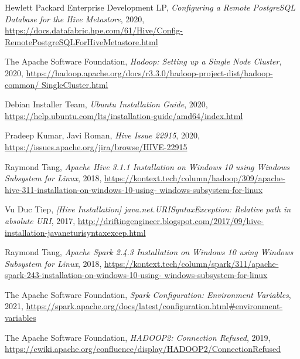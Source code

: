 \documentclass{article}
\begin{document}
\newpage
\begin{thebibliography}{9}
  Hewlett Packard Enterprise Development LP,
  \textit{Configuring a Remote PostgreSQL Database for the Hive Metastore},
  2020,
  \url{https://docs.datafabric.hpe.com/61/Hive/Config-RemotePostgreSQLForHiveMetastore.html}
  
  The Apache Software Foundation,
  \textit{Hadoop: Setting up a Single Node Cluster},
  2020,
  \url{
    https://hadoop.apache.org/docs/r3.3.0/hadoop-project-dist/hadoop-common/
    SingleCluster.html}

  Debian Installer Team,
  \textit{Ubuntu Installation Guide},
  2020,
  \url{https://help.ubuntu.com/lts/installation-guide/amd64/index.html}

  Pradeep Kumar, Javi Roman,
  \textit{Hive Issue 22915},
  2020,
  \url{https://issues.apache.org/jira/browse/HIVE-22915}

  Raymond Tang,
  \textit{Apache Hive 3.1.1 Installation on Windows 10 using Windows Subsystem for Linux},
  2018,
  \url{
    https://kontext.tech/column/hadoop/309/apache-hive-311-installation-on-windows-10-using-
    windows-subsystem-for-linux}

  Vu Duc Tiep,
  \textit{[Hive Installation] java.net.URISyntaxException: Relative path in absolute URI},
  2017,
  \url{http://driftingengineer.blogspot.com/2017/09/hive-installation-javaneturisyntaxexcep.html}

  Raymond Tang,
  \textit{Apache Spark 2.4.3 Installation on Windows 10 using Windows Subsystem for Linux},
  2018,
  \url{
    https://kontext.tech/column/spark/311/apache-spark-243-installation-on-windows-10-using-
    windows-subsystem-for-linux}

  The Apache Software Foundation,
  \textit{Spark Configuration: Environment Variables},
  2021,
  \url{https://spark.apache.org/docs/latest/configuration.html#environment-variables}

  The Apache Software Foundation,
  \textit{HADOOP2: Connection Refused},
  2019,
  \url{https://cwiki.apache.org/confluence/display/HADOOP2/ConnectionRefused}
\end{thebibliography}
\end{document}
